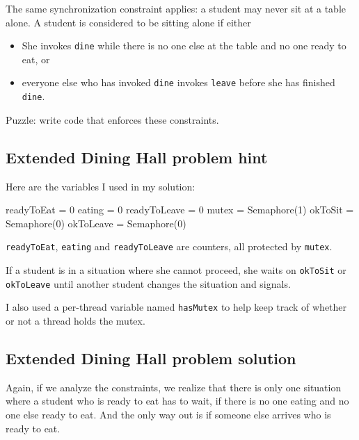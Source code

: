 \documentclass{book}
\begin{document}
The same synchronization constraint applies: a student may never sit
at a table alone.  A student is considered to be sitting alone if
either

\begin{itemize}

    \item She invokes {\tt dine} while there is no one else at the table
          and no one ready to eat, or

    \item everyone else who has invoked {\tt dine} invokes {\tt leave}
          before she has finished {\tt dine}.

\end{itemize}

Puzzle: write code that enforces these constraints.



\subsection {Extended Dining Hall problem hint}

Here are the variables I used in my solution:

\begin{unbreakable}[title={Extended Dining Hall problem hint}]{}
readyToEat = 0
eating = 0
readyToLeave = 0
mutex = Semaphore(1)
okToSit = Semaphore(0)
okToLeave = Semaphore(0)
\end{unbreakable}

{\tt readyToEat}, {\tt eating} and {\tt readyToLeave} are
counters, all protected by {\tt mutex}.

If a student is in a situation where she cannot proceed, she
waits on
    {\tt okToSit} or {\tt okToLeave} until another student changes
the situation and signals.

I also used a per-thread variable named {\tt hasMutex} to help
keep track of whether or not a thread holds the mutex.



\subsection {Extended Dining Hall problem solution}

Again, if we analyze the constraints, we realize that there is
only one situation where a student who is ready to eat has
to wait, if there is no one eating and no one else ready to
eat.  And the only way out is if someone else arrives who
is ready to eat.
\end{document}
